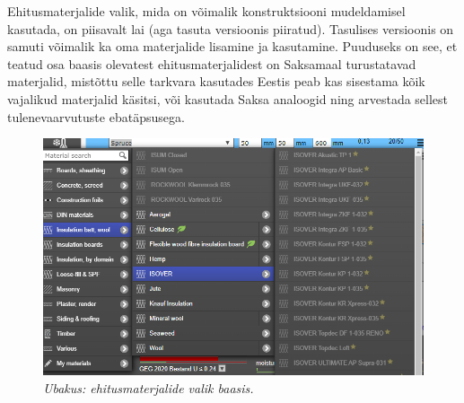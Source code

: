 Ehitusmaterjalide valik, mida on võimalik konstruktsiooni mudeldamisel kasutada, on piisavalt lai 
(aga tasuta versioonis piiratud). Tasulises versioonis on samuti võimalik ka oma materjalide 
lisamine ja kasutamine. Puuduseks on see, et teatud osa baasis olevatest ehitusmaterjalidest on Saksamaal
turustatavad materjalid, mistõttu selle tarkvara kasutades Eestis peab kas sisestama kõik vajalikud 
materjalid käsitsi, või kasutada Saksa analoogid ning arvestada sellest tulenevaarvutuste ebatäpsusega.
\begin{figure}[ht]
    \centering
    \includegraphics[width=.6\textwidth]{figures/01_analogues/03_ubakus_materials.png}
    \caption{\textit{Ubakus: ehitusmaterjalide valik baasis.}}
    \label{fig:ubakus_materials}
\end{figure}
